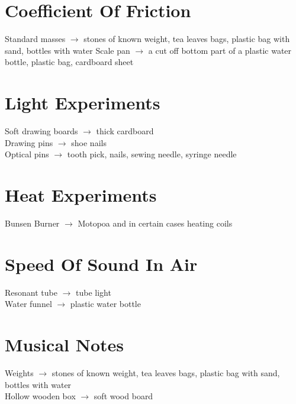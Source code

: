 \section{Coefficient Of Friction}
Standard masses $\rightarrow$ stones of known weight, tea leaves bags, plastic bag with sand, bottles with water
Scale pan $\rightarrow$ a cut off bottom part of a plastic water bottle, plastic bag, cardboard sheet

\section{Light Experiments}	
Soft drawing boards $\rightarrow$ thick cardboard\\
Drawing pins $\rightarrow$ shoe nails\\
Optical pins $\rightarrow$ tooth pick, nails, sewing needle, syringe needle

\section{Heat Experiments}
Bunsen Burner $\rightarrow$ Motopoa and in certain cases heating coils

\section{Speed Of Sound In Air}
Resonant tube $\rightarrow$ tube light\\
Water funnel $\rightarrow$ plastic water bottle

\section{Musical Notes}
Weights $\rightarrow$ stones of known weight, tea leaves bags, plastic bag with sand, bottles with water\\
Hollow wooden box $\rightarrow$ soft wood board
